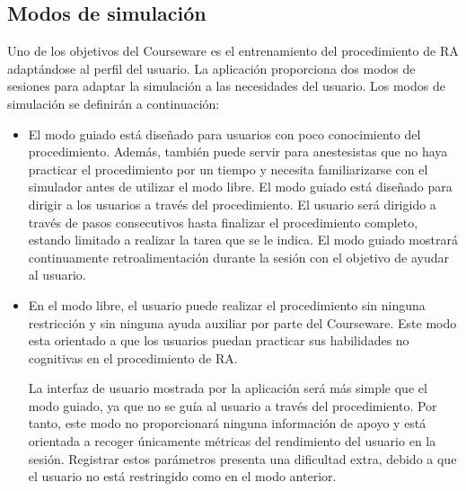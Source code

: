 


\subsection{Modos de simulación}
\label{course:modos}
Uno de los objetivos del \ac{Courseware} es el entrenamiento del procedimiento de \ac{RA} adaptándose al perfil del usuario. La aplicación proporciona dos modos de sesiones para adaptar la simulación a las necesidades del usuario. Los modos de simulación se definirán a continuación:

\begin{itemize}
    \item El modo guiado está diseñado para usuarios con poco conocimiento del procedimiento. Además, también puede servir para anestesistas que no haya practicar el procedimiento por un tiempo y necesita familiarizarse con el simulador antes de utilizar el modo libre. %
El modo guiado está diseñado para dirigir a los usuarios a través del procedimiento. El usuario será dirigido a través de pasos consecutivos hasta finalizar el procedimiento completo, estando limitado a realizar la tarea que se le indica. El modo guiado mostrará continuamente retroalimentación durante la sesión con el objetivo de ayudar al usuario.%

\item En el modo libre, el usuario puede realizar el procedimiento sin ninguna restricción y sin ninguna ayuda auxiliar por parte del \ac{Courseware}. Este modo esta orientado a que los usuarios puedan practicar sus habilidades no cognitivas en el procedimiento de \ac{RA}. 

La interfaz de usuario mostrada por la aplicación será más simple que el modo guiado, ya que no se guía al usuario a través del procedimiento. Por tanto, este modo no proporcionará ninguna información de apoyo y está orientada a recoger únicamente métricas del rendimiento del usuario en la sesión. Registrar estos parámetros presenta una dificultad extra, debido a que el usuario no está restringido como en el modo anterior. %

\end{itemize}

